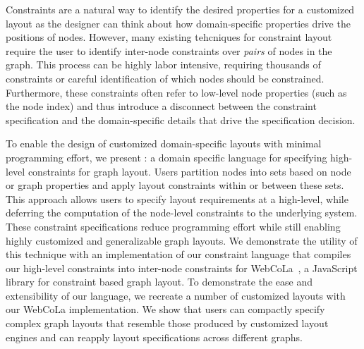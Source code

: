 Constraints are a natural way to identify the desired properties for a
customized layout as the designer can think about how domain-specific
properties drive the positions of nodes. However, many existing tehcniques
for constraint layout require the user to identify inter-node constraints
over \emph{pairs} of nodes in the graph. This process can be highly labor
intensive, requiring thousands of constraints or careful identification of
which nodes should be constrained. Furthermore, these constraints often
refer to low-level node properties (such as the node index) and thus
introduce a disconnect between the constraint specification and the
domain-specific details that drive the specification decision.

To enable the design of customized domain-specific layouts with minimal
programming effort, we present \projectname: a domain specific language for
specifying high-level constraints for graph layout. Users partition nodes
into sets based on node or graph properties and apply layout constraints
within or between these sets. This approach allows users to specify layout
requirements at a high-level, while deferring the computation of the
node-level constraints to the underlying system. These constraint
specifications reduce programming effort while still enabling highly
customized and generalizable graph layouts. We demonstrate the utility of
this technique with an implementation of our constraint language that
compiles our high-level constraints into inter-node constraints for
WebCoLa~\cite{WebCoLa}, a JavaScript library for constraint based graph
layout. To demonstrate the ease and extensibility of our language, we
recreate a number of customized layouts with our WebCoLa implementation. We
show that users can compactly specify complex graph layouts that resemble
those produced by customized layout engines and can reapply layout
specifications across different graphs.
